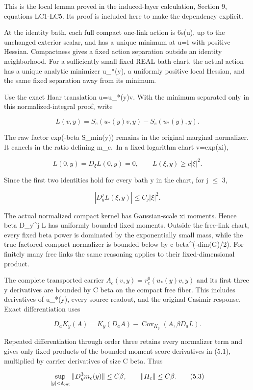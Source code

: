 \documentclass[
  11pt,
]{article}
\begin{document}
This is the local lemma proved in the induced-layer calculation, Section 9,
equations LC1-LC5. Its proof is included here to make the dependency
explicit.

At the identity bath, each full compact one-link action is 6s(u), up to
the unchanged exterior scalar, and has a unique minimum at u=I with
positive Hessian. Compactness gives a fixed action separation outside an
identity neighborhood. For a sufficiently small fixed REAL bath chart,
the actual action has a unique analytic minimizer u\_*(y), a uniformly
positive local Hessian, and the same fixed separation away from its
minimum.

Use the exact Haar translation u=u\_*(y)v. With the minimum separated
only in this normalized-integral proof, write

\[
 L(v,y)=S_e(u_*(y)v,y)-S_e(u_*(y),y).
\]

The raw factor exp(-beta S\_min(y)) remains in the original marginal
normalizer. It cancels in the ratio defining m\_c.~In a fixed logarithm
chart v=exp(xi),

\[
 L(0,y)=D_\xi L(0,y)=0,
 \qquad L(\xi,y)\ge c|\xi|^2.
\]

Since the first two identities hold for every bath y in the chart, for j
\(\leq\) 3,

\[
 |D_y^j L(\xi,y)|\le C_j|\xi|^2.
\tag{5.1}
\]

The actual normalized compact kernel has Gaussian-scale xi moments.
Hence beta D\_y\^{}j L has uniformly bounded fixed moments. Outside the
free-link chart, every fixed beta power is dominated by the
exponentially small mass, while the true factored compact normalizer is
bounded below by c beta\^{}(-dim(G)/2). For finitely many free links the
same reasoning applies to their fixed-dimensional product.

The complete transported carrier \(A_c(v,y)=r_c^0(u_*(y)v,y)\) and its
first three y derivatives are bounded by C beta on the compact free
fiber. This includes derivatives of u\_*(y), every source readout, and
the original Casimir response. Exact differentiation uses

\[
 D_aK_y(A)=K_y(D_aA)
            -\operatorname{Cov}_{K_y}(A,\beta D_aL).
\tag{5.2}
\]

Repeated differentiation through order three retains every normalizer
term and gives only fixed products of the bounded-moment score
derivatives in (5.1), multiplied by carrier derivatives of size C beta.
Thus

\[
 \sup_{|y|<\delta_{\rm out}}\|D_y^3m_c(y)\|\le C\beta,
 \qquad \|H_c\|\le C\beta.
\tag{5.3}
\]
\end{document}
